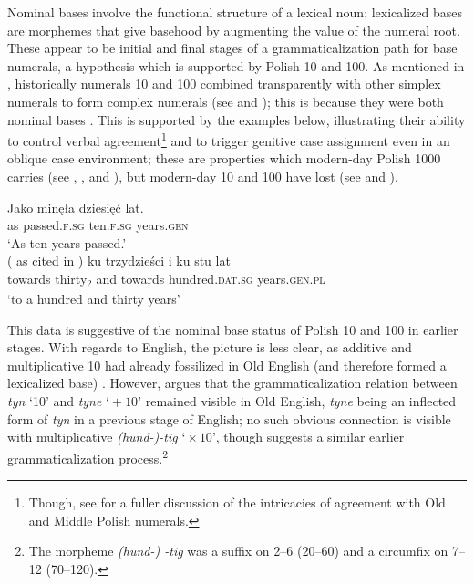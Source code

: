 \documentclass[output=paper]{langscibook}
\begin{document}
Nominal bases involve the functional structure of a lexical noun; lexicalized bases are morphemes that give basehood by augmenting the value of the numeral root. These appear to be initial and final stages of a grammaticalization path for base numerals, a hypothesis which is supported by Polish 10 and 100. As mentioned in , historically numerals 10 and 100 combined transparently with other simplex numerals to form complex numerals (see \citealt{miechowicz2014hist} and \citealt{dziubala2014num}); this is because they were both nominal bases \citep[see also][]{miechowicz2014hist}. This is supported by the examples below, illustrating their ability to control verbal agreement\footnote{Though, see \citet{miechowicz2014hist} for a fuller discussion of the intricacies of agreement with Old and Middle Polish numerals.} and to trigger genitive case assignment even in an oblique case environment; these are properties which modern-day Polish 1000 carries (see , , and ), but modern-day 10 and 100 have lost (see  and ).

\ea \label{klo:ex:nominal10,100}
\ea \gll Jako minęła dziesięć lat.\\
as passed.\textsc{f.sg} ten.\textsc{f.sg} years.\textsc{gen}\\
\glt `As ten years passed.'\\\hfill(\citealt{siuciak2008ksztaltowanie} as cited in \citealt[103]{dziubala2014num})
\ex \gll ku trzydzieści i ku stu lat\\
towards thirty\textsubscript{?} and towards hundred.\textsc{dat.sg}  years.\textsc{gen.pl}\\
\glt `to a hundred and thirty years' \hfill\citep[99]{miechowicz2013agrhist}
\z \z

\noindent This data is suggestive of the nominal base status of Polish 10 and 100 in earlier stages. With regards to English, the picture is less clear, as additive and multiplicative 10 had already fossilized in Old English (and therefore formed a lexicalized base) \citep{von2010cardinal}. However, \citet{von2010cardinal} argues that the grammaticalization relation between \textit{tyn} `10' and \textit{tyne} `${}+10$' remained visible in Old English, \textit{tyne} being an inflected form of \textit{tyn} in a previous stage of English; no such obvious connection is visible with multiplicative \textit{(hund-)-tig} `${}\times 10$', though \citet{von2010cardinal} suggests a similar earlier grammaticalization process.\footnote{The morpheme \textit{(hund-) -tig} was a suffix on 2--6 (20--60) and a circumfix on 7--12 (70--120).}
\end{document}

